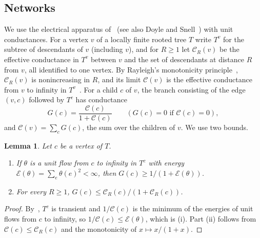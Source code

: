 \documentclass[11pt]{amsart}
\newtheorem{lemma}[theorem]{Lemma}
\theoremstyle{remark}
\begin{document}
\subsection*{Networks}
We use the electrical apparatus of~\cite[Chapter~2]{LP} (see also Doyle and Snell~\cite{DS}) with unit conductances. For a vertex $v$ of a locally finite rooted tree $T$ write $T^v$ for the subtree of descendants of $v$ (including $v$), and for $R\ge1$ let $\mathcal C_R(v)$ be the effective conductance in $T^v$ between $v$ and the set of descendants at distance $R$ from $v$, all identified to one vertex. By Rayleigh's monotonicity principle~\cite[p.~35]{LP}, $\mathcal C_R(v)$ is nonincreasing in $R$, and its limit $\mathcal C(v)$ is the effective conductance from $v$ to infinity in $T^v$~\cite[p.~27]{LP}. For a child $c$ of $v$, the branch consisting of the edge $(v,c)$ followed by $T^c$ has conductance
\[
G(c)=\frac{\mathcal C(c)}{1+\mathcal C(c)}\qquad(G(c)=0\text{ if }\mathcal C(c)=0),
\]
and $\mathcal C(v)=\sum_cG(c)$, the sum over the children of $v$. We use two bounds.

\begin{lemma}\label{lem:bounds}
Let $c$ be a vertex of $T$.
\begin{enumerate}[label=\textup{(\roman*)}]
\item If $\theta$ is a unit flow from $c$ to infinity in $T^c$ with energy $\mathcal E(\theta)=\sum_e\theta(e)^2<\infty$, then $G(c)\ge 1/(1+\mathcal E(\theta))$.
\item For every $R\ge1$, $G(c)\le \mathcal C_R(c)/(1+\mathcal C_R(c))$.
\end{enumerate}
\end{lemma}

\begin{proof}
By~\cite[Theorem~2.11 and Proposition~2.12, p.~39]{LP}, $T^c$ is transient and $1/\mathcal C(c)$ is the minimum of the energies of unit flows from $c$ to infinity, so $1/\mathcal C(c)\le\mathcal E(\theta)$, which is (i). Part (ii) follows from $\mathcal C(c)\le\mathcal C_R(c)$ and the monotonicity of $x\mapsto x/(1+x)$.
\end{proof}
\end{document}
